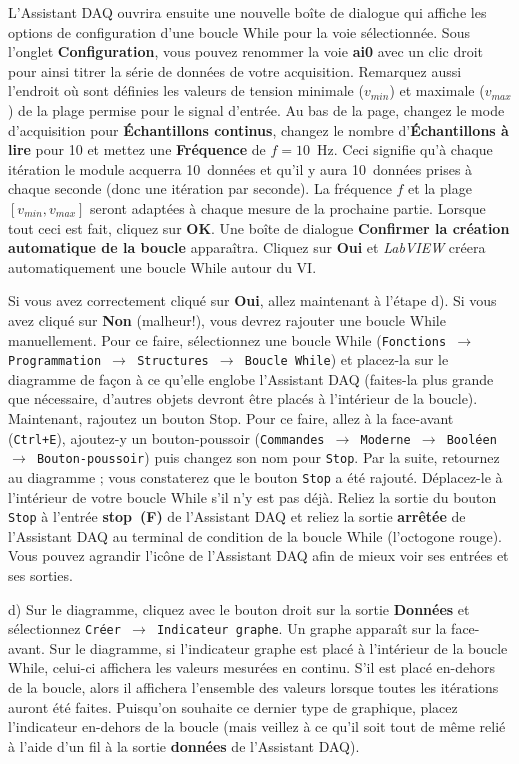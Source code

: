 \documentclass[canadien,12pt,oneside,letterpaper]{article}
\begin{document}
L'Assistant DAQ ouvrira ensuite une nouvelle boîte de dialogue qui affiche les options de configuration d'une boucle While pour la voie sélectionnée. Sous l'onglet \textbf{Configuration}, vous pouvez renommer la voie \textbf{ai0} avec un clic droit pour ainsi titrer la série de données de votre acquisition. Remarquez aussi l'endroit où sont définies les valeurs de tension minimale ($v_{min}$) et maximale ($v_{max}$) de la plage permise pour le signal d'entrée. Au bas de la page, changez le mode d'acquisition pour \textbf{Échantillons continus}, changez le nombre d'\textbf{Échantillons à lire} pour 10 et mettez une \textbf{Fréquence} de $f=10$~Hz. Ceci signifie qu'à chaque itération le module acquerra 10~données et qu'il y aura 10~données prises à chaque seconde (donc une itération par seconde). La fréquence $f$ et la plage $[v_{min},v_{max}]$ seront adaptées à chaque mesure de la prochaine partie. Lorsque tout ceci est fait, cliquez sur \textbf{OK}. Une boîte de dialogue \textbf{Confirmer la création automatique de la boucle} apparaîtra. Cliquez sur \textbf{Oui} et \textit{LabVIEW} créera automatiquement une boucle While autour du VI.

Si vous avez correctement cliqué sur \textbf{Oui}, allez maintenant à l'étape d). Si vous avez cliqué sur \textbf{Non} (malheur!), vous devrez rajouter une boucle While manuellement. Pour ce faire, sélectionnez une boucle While (\texttt{Fonctions $\rightarrow$ Programmation $\rightarrow$ Structures $\rightarrow$ Boucle While}) et placez-la sur le diagramme de façon à ce qu'elle englobe l'Assistant DAQ (faites-la plus grande que nécessaire, d'autres objets devront être placés à l'intérieur de la boucle). Maintenant, rajoutez un bouton Stop. Pour ce faire, allez à la face-avant (\texttt{Ctrl+E}), ajoutez-y un bouton-poussoir (\texttt{Commandes $\rightarrow$ Moderne $\rightarrow$ Booléen $\rightarrow$ Bouton-poussoir}) puis changez son nom pour \texttt{Stop}. Par la suite, retournez au diagramme ; vous constaterez que le bouton \texttt{Stop} a été rajouté. Déplacez-le à l'intérieur de votre boucle While s'il n'y est pas déjà. Reliez la sortie du bouton \texttt{Stop} à l'entrée \textbf{stop~(F)} de l'Assistant DAQ et reliez la sortie \textbf{arrêtée} de l'Assistant DAQ au terminal de condition de la boucle While (l'octogone rouge). Vous pouvez agrandir l'icône de l'Assistant DAQ afin de mieux voir ses entrées et ses sorties.

d) Sur le diagramme, cliquez avec le bouton droit sur la sortie \textbf{Données} et sélectionnez \texttt{Créer $\rightarrow$ Indicateur graphe}. Un graphe apparaît sur la face-avant. Sur le diagramme, si l'indicateur graphe est placé à l'intérieur de la boucle While, celui-ci affichera les valeurs mesurées en continu. S'il est placé en-dehors de la boucle, alors il affichera l'ensemble des valeurs lorsque toutes les itérations auront été faites. Puisqu'on souhaite ce dernier type de graphique, placez l'indicateur en-dehors de la boucle (mais veillez à ce qu'il soit tout de même relié à l'aide d'un fil à la sortie \textbf{données} de l'Assistant DAQ).
\end{document}
